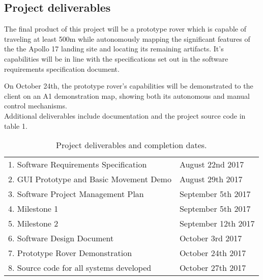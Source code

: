 \documentclass{article}
\begin{document}
\subsection{Project deliverables}
\begin{adjustwidth}{1em}{0pt}
The final product of this project will be a prototype rover which is capable of traveling at least 500m while autonomously mapping the significant features of the the Apollo 17 landing site and locating its remaining artifacts. It's capabilities will be in line with the specifications set out in the software requirements specification document.

On October 24th, the prototype rover's capabilities will be demonstrated to the client on an A1 demonstration map, showing both its autonomous and manual control mechanisms.\\

Additional deliverables include documentation and the project source code in table 1.\\

\begin{table}[H]
\caption{Project deliverables and completion dates.}
  \centering
\begin{tabular}{ll}
1. Software Requirements Specification & August 22nd 2017 \\
2. GUI Prototype and Basic Movement Demo & August 29th 2017 \\
3. Software Project Management Plan & September 5th 2017 \\
4. Milestone 1 & September 5th 2017 \\
5. Milestone 2 & September 12th 2017 \\
6. Software Design Document & October 3rd 2017\\
7. Prototype Rover Demonstration & October 24th 2017\\
8. Source code for all systems developed & October 27th 2017 \\
\end{tabular}
\end{table}
\end{adjustwidth}

\end{document}
